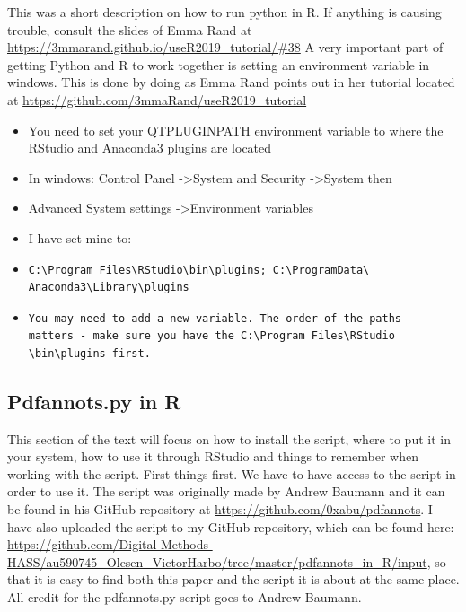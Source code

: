 \documentclass{article}
\begin{document}
This was a short description on how to run python in R. If anything is causing trouble, consult the slides of Emma Rand at \url{https://3mmarand.github.io/useR2019_tutorial/#38} \newline
A very important part of getting Python and R to work together is setting an environment variable in windows. This is done by doing as Emma Rand points out in her tutorial located at \url{https://github.com/3mmaRand/useR2019_tutorial}
\begin{itemize}
    \item You need to set your QT\textunderscore PLUGIN\textunderscore PATH environment variable to where the RStudio and Anaconda3 plugins are located
    \item In windows: Control Panel -\textgreater System and Security -\textgreater System then
    \item Advanced System settings -\textgreater Environment variables
    \item I have set mine to:
    \item \begin{verbatim}
C:\Program Files\RStudio\bin\plugins; C:\ProgramData\
Anaconda3\Library\plugins  
    \end{verbatim}
    \item \begin{verbatim}You may need to add a new variable. The order of the paths
matters - make sure you have the C:\Program Files\RStudio
\bin\plugins first.
    \end{verbatim}
\end{itemize}

\subsection{Pdfannots.py in R}
This section of the text will focus on how to install the script, where to put it in your system, how to use it through RStudio and things to remember when working with the script. First things first. We have to have access to the script in order to use it. The script was originally made by Andrew Baumann and it can be found in his GitHub repository at \url{https://github.com/0xabu/pdfannots}. I have also uploaded the script to my GitHub repository, which can be found here: \url{https://github.com/Digital-Methods-HASS/au590745_Olesen_VictorHarbo/tree/master/pdfannots_in_R/input}, so that it is easy to find both this paper and the script it is about at the same place. All credit for the pdfannots.py script goes to Andrew Baumann. 
\end{document}
